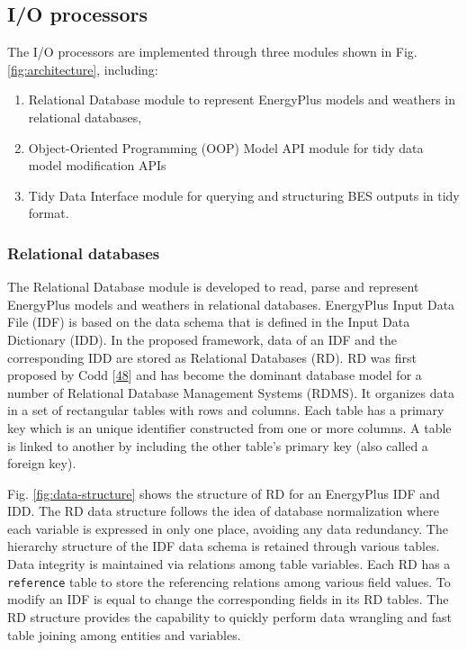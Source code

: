 \documentclass[3p, times]{elsarticle} %
\providecommand{\tightlist}{%
  \setlength{\itemsep}{0pt}\setlength{\parskip}{0pt}}
\begin{document}
\hypertarget{sec:eplusr-io}{%
\subsection{I/O processors}\label{sec:eplusr-io}}

The I/O processors are implemented through three modules shown in Fig.
\ref{fig:architecture}, including:

\begin{enumerate}
\def\labelenumi{\arabic{enumi}.}
\tightlist
\item
  Relational Database module to represent EnergyPlus models and weathers in
  relational databases,
\item
  Object-Oriented Programming (OOP) Model API module for tidy data model
  modification APIs
\item
  Tidy Data Interface module for querying and structuring BES outputs in tidy
  format.
\end{enumerate}

\hypertarget{relational-databases}{%
\subsubsection{Relational databases}\label{relational-databases}}

The Relational Database module is developed to read, parse and represent
EnergyPlus models and weathers in relational databases. EnergyPlus Input Data
File (IDF) is based on the data schema that is defined in the Input Data
Dictionary (IDD). In the proposed framework, data of an IDF and the
corresponding IDD are stored as Relational Databases (RD). RD was first proposed
by Codd {[}\protect\hyperlink{ref-Codd1990}{48}{]} and has become the dominant database model for a number of
Relational Database Management Systems (RDMS). It organizes data in a set of
rectangular tables with rows and columns. Each table has a primary key which is
an unique identifier constructed from one or more columns. A table is linked to
another by including the other table's primary key (also called a foreign key).

Fig. \ref{fig:data-structure} shows the structure of RD for an EnergyPlus IDF
and IDD. The RD data structure follows the idea of database normalization where
each variable is expressed in only one place, avoiding any data redundancy. The
hierarchy structure of the IDF data schema is retained through various tables.
Data integrity is maintained via relations among table variables. Each RD has a
\texttt{reference} table to store the referencing relations among various field values.
To modify an IDF is equal to change the corresponding fields in its RD tables.
The RD structure provides the capability to quickly perform data wrangling and
fast table joining among entities and variables.
\end{document}
